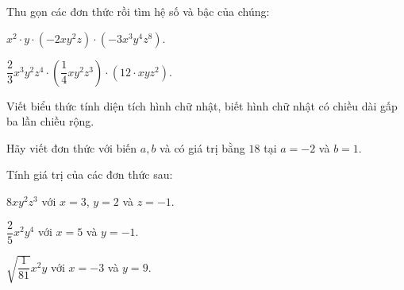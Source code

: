 \begin{bt}%
	Thu gọn các đơn thức rồi tìm hệ số và bậc của chúng:
	\begin{listEX}
	\item $x^2\cdot y\cdot (-2xy^2z)\cdot(-3x^3y^4z^8)$.
	\item $\dfrac{2}{3}x^3y^2z^4\cdot \left(\dfrac{1}{4}xy^2z^3\right)\cdot(12\cdot xyz^2)$.
	\end{listEX}
\end{bt}

\begin{bt}%
		Viết biểu thức tính diện tích hình chữ nhật, biết hình chữ nhật có chiều dài gấp ba lần chiều rộng.
	\loigiai{}
\end{bt}

\begin{bt}%
	Hãy viết đơn thức với biến $a, b$ và có giá trị bằng $18$ tại $a=-2$ và $b=1$.
	\loigiai{}
\end{bt}

\begin{bt}%
	Tính giá trị của các đơn thức sau:
	\begin{listEX}[2]
	\item $8xy^2z^3$ với $x=3$, $y=2$ và $z=-1$.
	\item $\dfrac{2}{5}x^2y^4$ với $x=5$ và $y=-1$.
	\item $\sqrt{\dfrac{1}{81}}x^2y$ với $x=-3$ và $y=9$.
	\end{listEX}
\end{bt}


